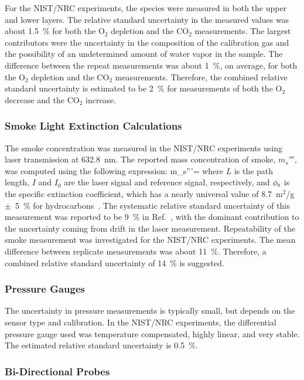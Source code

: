For the NIST/NRC experiments, the species were measured in both the upper and lower layers. The relative standard uncertainty in the measured values was about 1.5~\% for both the O$_2$ depletion and the CO$_2$ measurements. The largest contributors were the uncertainty in the composition of the calibration gas and the possibility of an undetermined amount of water vapor in the sample. The difference between the repeat measurements was about 1~\%, on average, for both the O$_2$ depletion and the CO$_2$ measurements. Therefore, the combined relative standard uncertainty is estimated to be 2~\% for measurements of both the O$_2$ decrease and the CO$_2$ increase.

\subsubsection{Smoke Light Extinction Calculations}

The smoke concentration was measured in the NIST/NRC experiments using laser transmission at 632.8~nm. The reported mass concentration of smoke, $m_s'''$, was computed using the following expression:
\be
   m_s'''=
\ee
where $L$ is the path length, $I$ and $I_0$ are the laser signal and reference signal, respectively, and $\phi_{\rm s}$ is the specific extinction coefficient, which has a nearly universal value of 8.7~m$^2$/g~$\pm$~5~\% for hydrocarbons~\cite{Mulholland:F+M}. The systematic relative standard uncertainty of this measurement was reported to be 9~\% in Ref.~\cite{Hamins:SP1013-1}, with the dominant contribution to the uncertainty coming from drift in the laser measurement. Repeatability of the smoke measurement was investigated for the NIST/NRC experiments. The mean difference between replicate measurements was about 11~\%. Therefore, a combined relative standard uncertainty of 14~\% is suggested.

\subsubsection{Pressure Gauges}

The uncertainty in pressure measurements is typically small, but depends on the sensor type and calibration. In the NIST/NRC experiments, the differential pressure gauge used was temperature compensated, highly linear, and very stable. The estimated relative standard uncertainty is 0.5~\%.

\subsubsection{Bi-Directional Probes}

